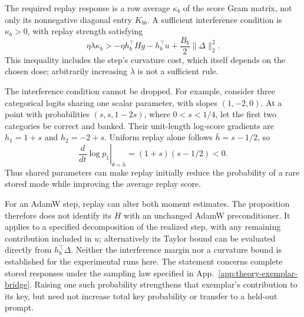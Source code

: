 The required replay response is a row average $\kappa_b$ of the score Gram
matrix, not only its nonnegative diagonal entry $K_{bb}$. A sufficient
interference condition is $\kappa_b>0$, with replay strength satisfying
\[
 \eta\lambda\kappa_b>
   -\eta h_b^\top Hg-h_b^\top u
       +\frac{B_b}{2}\|\Delta\|_2^2.
\]
This inequality includes the step's curvature cost, which itself depends on
the chosen dose; arbitrarily increasing $\lambda$ is not a sufficient rule.

The interference condition cannot be dropped. For example, consider three
categorical logits sharing one scalar parameter, with slopes $(1,-2,0)$.
At a point with probabilities $(s,s,1-2s)$, where $0<s<1/4$, let the first
two categories be correct and banked. Their unit-length log-score gradients
are $h_1=1+s$ and $h_2=-2+s$. Uniform replay alone follows
$\bar h=s-1/2$, so
\[
 \left.\frac{d}{dt}\log p_1\right|_{\dot\theta=\bar h}
   =(1+s)(s-1/2)<0.
\]
Thus shared parameters can make replay initially reduce the probability of
a rare stored mode while improving the average replay score.

For an AdamW step, replay can alter both moment estimates. The proposition
therefore does not identify its $H$ with an unchanged AdamW preconditioner.
It applies to a specified decomposition of the realized step, with any
remaining contribution included in $u$; alternatively its Taylor bound can
be evaluated directly from $h_b^\top\Delta$. Neither the interference margin
nor a curvature bound is established for the experimental runs here.
The statement concerns complete stored responses under the sampling law
specified in App.~\ref{app:theory-exemplar-bridge}. Raising one such
probability strengthens that exemplar's contribution to its key, but need
not increase total key probability or transfer to a held-out prompt.
